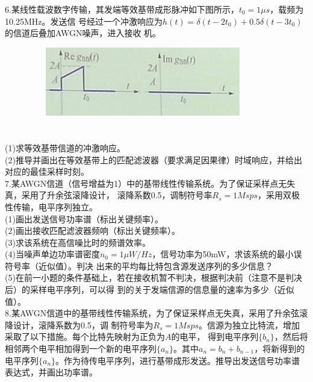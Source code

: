 \documentclass[UTF8]{ctexart}
\begin{document}
6.某线性载波数字传输，其发端等效基带成形脉冲如下图所示，$t_0=1\mu s$，载频为10.25MHz。发送信
号经过一个冲激响应为$h(t)=\delta(t-2t_0)+0.5\delta(t-3t_0)$的信道后叠加AWGN噪声，进入接收
机。\\
\begin{figure}[H]
  \centering
  \includegraphics[width=10cm,height=3cm]{6.jpg}
\end{figure}
\section*{}
 (1)求等效基带信道的冲激响应。\\
(2)推导并画出在等效基带上的匹配滤波器（要求满足因果律）时域响应，并给出对应的最佳采样时刻。\\
7.某AWGN信道（信号增益为1）中的基带线性传输系统。为了保证采样点无失真，采用了升余弦滚降设计，
滚降系数0.5，调制符号率$R_s=1Msps$，采用双极性传输，电平序列独立。\\
(1)画出发送信号功率谱（标出关键频率）。\\
(2)画出接收匹配滤波器频响（标出关键频率）。\\
(3)求该系统在高信噪比时的频谱效率。\\
(4)当噪声单边功率谱密度$n_0=1\mu W/Hz$，信号功率为50mW，求该系统的最小误符号率（近似值）。判决
出来的平均每比特包含源发送序列的多少信息？\\
(5)在前一小题的条件基础上，若在接收机暂不判决，根据判决前（注意不是判决后）的采样电平序列，可以得
到的关于发端信源的信息量的速率为多少（近似值）。\\
8.某AWGN信道中的基带线性传输系统，为了保证采样点无失真，采用了升余弦滚降设计，滚降系数为0.5，调
制符号率为$R_s=1Msps$。信源为独立比特流，增加采取了以下措施。每个比特先映射为正负为$A$的电平，
得到电平序列$\{b_n\}$，然后将相邻两个电平相加得到一个新的电平序列$\{a_n\}$。其中$a_n=b_n+b_
  {n-1}$，将新得到的电平序列$\{a_n\}$。作为待传电平序列，进行基带成形发送。推导出发送信号功率谱
表达式，并画出功率谱。\\
\end{document}

